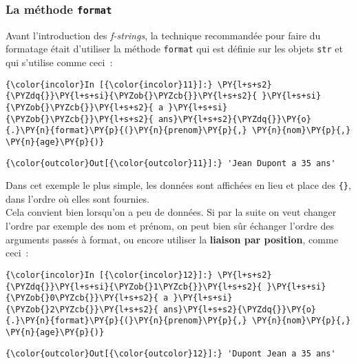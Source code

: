     \hypertarget{la-muxe9thode-format}{%
\subsubsection{\texorpdfstring{La méthode
\texttt{format}}{La méthode format}}\label{la-muxe9thode-format}}

    Avant l'introduction des \emph{f-strings}, la technique recommandée pour
faire du formatage était d'utiliser la méthode \texttt{format} qui est
définie sur les objets \texttt{str} et qui s'utilise comme ceci~:

    \begin{Verbatim}[commandchars=\\\{\}]
{\color{incolor}In [{\color{incolor}11}]:} \PY{l+s+s2}{\PYZdq{}}\PY{l+s+si}{\PYZob{}\PYZcb{}}\PY{l+s+s2}{ }\PY{l+s+si}{\PYZob{}\PYZcb{}}\PY{l+s+s2}{ a }\PY{l+s+si}{\PYZob{}\PYZcb{}}\PY{l+s+s2}{ ans}\PY{l+s+s2}{\PYZdq{}}\PY{o}{.}\PY{n}{format}\PY{p}{(}\PY{n}{prenom}\PY{p}{,} \PY{n}{nom}\PY{p}{,} \PY{n}{age}\PY{p}{)}
\end{Verbatim}


\begin{Verbatim}[commandchars=\\\{\}]
{\color{outcolor}Out[{\color{outcolor}11}]:} 'Jean Dupont a 35 ans'
\end{Verbatim}
            
    Dans cet exemple le plus simple, les données sont affichées en lieu et
place des \texttt{\{\}}, dans l'ordre où elles sont fournies.\\

    Cela convient bien lorsqu'on a peu de données. Si par la suite on veut
changer l'ordre par exemple des nom et prénom, on peut bien sûr échanger
l'ordre des arguments passés à format, ou encore utiliser la
\textbf{liaison par position}, comme ceci~:

    \begin{Verbatim}[commandchars=\\\{\}]
{\color{incolor}In [{\color{incolor}12}]:} \PY{l+s+s2}{\PYZdq{}}\PY{l+s+si}{\PYZob{}1\PYZcb{}}\PY{l+s+s2}{ }\PY{l+s+si}{\PYZob{}0\PYZcb{}}\PY{l+s+s2}{ a }\PY{l+s+si}{\PYZob{}2\PYZcb{}}\PY{l+s+s2}{ ans}\PY{l+s+s2}{\PYZdq{}}\PY{o}{.}\PY{n}{format}\PY{p}{(}\PY{n}{prenom}\PY{p}{,} \PY{n}{nom}\PY{p}{,} \PY{n}{age}\PY{p}{)}
\end{Verbatim}


\begin{Verbatim}[commandchars=\\\{\}]
{\color{outcolor}Out[{\color{outcolor}12}]:} 'Dupont Jean a 35 ans'
\end{Verbatim}
            
